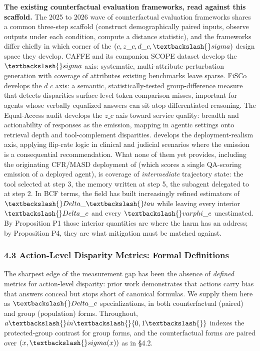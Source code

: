 \documentclass[10pt]{article}
\begin{document}
\textbf{The existing counterfactual evaluation frameworks, read against this scaffold.} The 2025 to 2026 wave of counterfactual evaluation frameworks shares a common three-step scaffold (construct demographically paired inputs, observe outputs under each condition, compute a distance statistic), and the frameworks differ chiefly in which corner of the $(c, z\_c, d\_c, \textbackslash\{\}sigma)$ design space they develop. CAFFE \cite{parziale2025systematic} and its companion SCOPE dataset \cite{parziale2026scope} develop the $\textbackslash\{\}sigma$ axis: systematic, multi-attribute perturbation generation with coverage of attributes existing benchmarks leave sparse. FiSCo \cite{xu2025quantifying} develops the $d\_c$ axis: a semantic, statistically-tested group-difference measure that detects disparities surface-level token comparison misses, important for agents whose verbally equalized answers can sit atop differentiated reasoning. The Equal-Access audit \cite{amirimargavi2026equal} develops the $z\_c$ axis toward service quality: breadth and actionability of responses as the emission, mapping in agentic settings onto retrieval depth and tool-complement disparities. \cite{basu2026names} develops the deployment-realism axis, applying flip-rate logic in clinical and judicial scenarios where the emission is a consequential recommendation. What none of them yet provides, including the originating CFR/MASD deployment of \cite{mayilvaghanan2026counterfactual} (which scores a single QA-scoring emission of a deployed agent), is coverage of \emph{intermediate} trajectory state: the tool selected at step 3, the memory written at step 5, the subagent delegated to at step 2. In BCF terms, the field has built increasingly refined estimators of $\textbackslash\{\}Delta\_\textbackslash\{\}tau$ while leaving every interior $\textbackslash\{\}Delta\_c$ and every $\textbackslash\{\}varphi\_e$ unestimated. By Proposition P1 those interior quantities are where the harm has an address; by Proposition P4, they are what mitigation must be matched against.

\subsubsection*{4.3 Action-Level Disparity Metrics: Formal Definitions}

The sharpest edge of the measurement gap has been the absence of \emph{defined} metrics for action-level disparity: prior work demonstrates that actions carry bias that answers conceal \cite{li2025actions,blankenstein2025biasbusters,xu2026ducx} but stops short of canonical formulas. We supply them here as $\textbackslash\{\}Delta\_c$ specializations, in both counterfactual (paired) and group (population) forms. Throughout, $a \textbackslash\{\}in \textbackslash\{\}\{0, 1\textbackslash\{\}\}$ indexes the protected-group contrast for group forms, and the counterfactual forms are paired over $(x, \textbackslash\{\}sigma(x))$ as in \S{}4.2.
\end{document}
